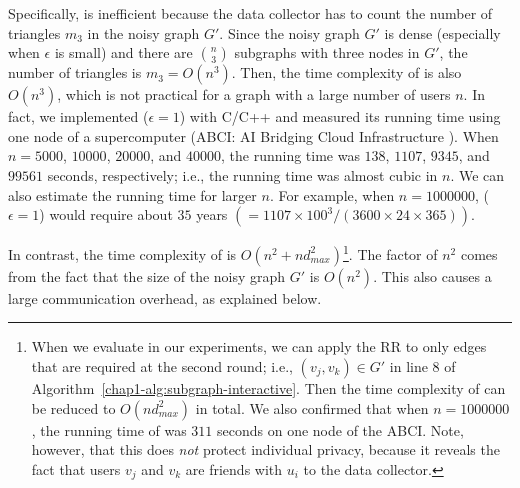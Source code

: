 Specifically,  is inefficient because the data collector has to count the number of triangles $m_3$ in the noisy graph $G'$. 
Since the noisy graph $G'$ is dense (especially when $\epsilon$ is small) and there are $\binom{n}{3}$ subgraphs with three nodes in $G'$, the number of triangles is $m_3 = O(n^3)$. 
Then, the time complexity of  is 
also $O(n^3)$, which is not practical for a graph with a large number of users $n$.
In fact, we implemented  ($\epsilon=1$) with C/C++ and measured its running time using one node of a supercomputer (ABCI: AI Bridging Cloud Infrastructure \cite{ABCI}). 
When $n=5000$, $10000$, $20000$, and $40000$, the running time was $138$, $1107$, $9345$, and $99561$ seconds, respectively; i.e., the running time was almost cubic in $n$. 
We can also estimate the running time for larger $n$. 
For example, when $n=1000000$,  ($\epsilon=1$) would require about $35$ years $(=1107 \times 100^3 /(3600 \times 24 \times 365))$. 

In contrast, the time complexity of  
is 
$O(n^2 + n d_{max}^2)$\footnote{When we 
evaluate 
 in our experiments, 
we can apply the RR to only edges that are required at the second round; i.e., $(v_j,v_k) \in G'$ in line 8 of Algorithm~\ref{chap1-alg:subgraph-interactive}. 
Then the time complexity of  
can be reduced to 
$O(n d_{max}^2)$ in total. 
We also confirmed that when $n=1000000$, the running time of  was $311$ seconds on one node of the ABCI. 
Note, however, that this does \textit{not} protect individual privacy, because it reveals the fact that users $v_j$ and $v_k$ are friends with $u_i$ to the data collector.}. 
The factor of $n^2$ comes from the fact that the size of the noisy graph $G'$ is $O(n^2)$. 
This also causes a large communication overhead, as explained below.

